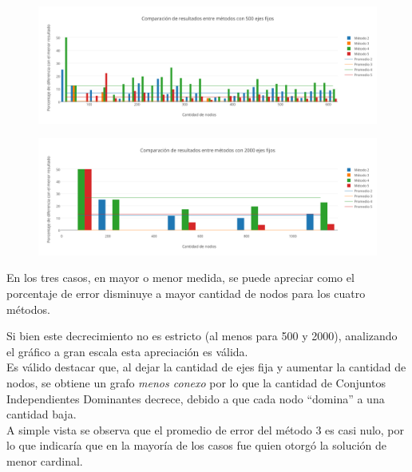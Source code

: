   \begin{figure}[h!]
   \begin{center}
 	\includegraphics[scale=0.55]{imagenes/local/resultados/500ejes.png}
   \end{center}
 \end{figure}
 
\newpage 
 
   \begin{figure}[h!]
   \begin{center}
 	\includegraphics[scale=0.55]{imagenes/local/resultados/2000ejes.png}
   \end{center}
 \end{figure}
 
En los tres casos, en mayor o menor medida, se puede apreciar como el porcentaje de error disminuye a mayor cantidad de nodos para los cuatro métodos.

Si bien este decrecimiento no es estricto (al menos para 500 y 2000), analizando el gráfico a gran escala esta apreciación es válida.\\

Es válido destacar que, al dejar la cantidad de ejes fija y aumentar la cantidad de nodos, se obtiene un grafo \textit{menos conexo} por lo que la cantidad de Conjuntos Independientes Dominantes decrece, debido a que cada nodo ``domina'' a una cantidad baja.\\

A simple vista se observa que el promedio de error del método 3 es casi nulo, por lo que indicaría que en la mayoría de los casos fue quien otorgó la solución de menor cardinal. 
 
